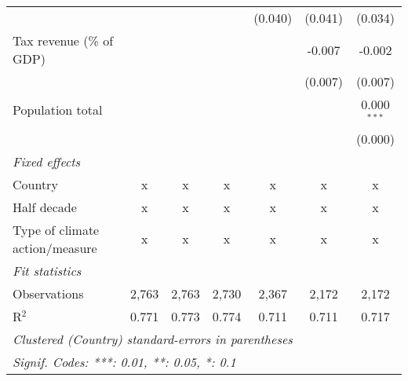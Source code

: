\begin{tabular}{lcccccc}
                                                 &                &                &                & (0.040)        & (0.041)        & (0.034)\\   
   Tax revenue (\% of GDP)                       &                &                &                &                & -0.007         & -0.002\\   
                                                 &                &                &                &                & (0.007)        & (0.007)\\   
   Population total                              &                &                &                &                &                & 0.000$^{***}$\\   
                                                 &                &                &                &                &                & (0.000)\\   
   \emph{Fixed effects}\\
   Country                                       & x              & x              & x              & x              & x              & x\\  
   Half decade                                   & x              & x              & x              & x              & x              & x\\  
   Type of climate action/measure                & x              & x              & x              & x              & x              & x\\  
   \midrule \emph{Fit statistics}\\
   Observations                                  & 2,763          & 2,763          & 2,730          & 2,367          & 2,172          & 2,172\\  
   R$^2$                                         & 0.771          & 0.773          & 0.774          & 0.711          & 0.711          & 0.717\\  
   \midrule
   \multicolumn{7}{l}{\emph{Clustered (Country) standard-errors in parentheses}}\\
   \multicolumn{7}{l}{\emph{Signif. Codes: ***: 0.01, **: 0.05, *: 0.1}}\\
\end{tabular}
\par\endgroup


